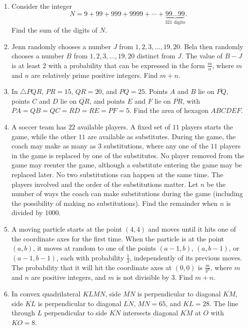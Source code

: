 \documentclass{article}
\begin{document}
\begin{enumerate}[label=\arabic*., itemsep=0.5em]
\item Consider the integer 
\begin{equation*}
N = 9 + 99 + 999 + 9999 + \cdots + \underbrace{99\ldots 99}_\text{321 digits}.
\end{equation*}
Find the sum of the digits of \(N\).\par \vspace{0.5em}\item Jenn randomly chooses a number \(J\) from \(1, 2, 3,\ldots, 19, 20\). Bela then randomly chooses a number \(B\) from \(1, 2, 3,\ldots, 19, 20\) distinct from \(J\). The value of \(B - J\) is at least \(2\) with a probability that can be expressed in the form \(\tfrac{m}{n}\), where \(m\) and \(n\) are relatively prime positive integers. Find \(m+n\).\par \vspace{0.5em}\item In \(\triangle PQR\), \(PR=15\), \(QR=20\), and \(PQ=25\). Points \(A\) and \(B\) lie on \(\overline{PQ}\), points \(C\) and \(D\) lie on \(\overline{QR}\), and points \(E\) and \(F\) lie on \(\overline{PR}\), with \(PA=QB=QC=RD=RE=PF=5\). Find the area of hexagon \(ABCDEF\).\par \vspace{0.5em}\item A soccer team has \(22\) available players. A fixed set of \(11\) players starts the game, while the other \(11\) are available as substitutes. During the game, the coach may make as many as \(3\) substitutions, where any one of the \(11\) players in the game is replaced by one of the substitutes. No player removed from the game may reenter the game, although a substitute entering the game may be replaced later. No two substitutions can happen at the same time. The players involved and the order of the substitutions matter. Let \(n\) be the number of ways the coach can make substitutions during the game (including the possibility of making no substitutions). Find the remainder when \(n\) is divided by \(1000\).\par \vspace{0.5em}\item A moving particle starts at the point \((4,4)\) and moves until it hits one of the coordinate axes for the first time. When the particle is at the point \((a,b)\), it moves at random to one of the points \((a-1,b)\), \((a,b-1)\), or \((a-1,b-1)\), each with probability \(\tfrac{1}{3}\), independently of its previous moves. The probability that it will hit the coordinate axes at \((0,0)\) is \(\tfrac{m}{3^n}\), where \(m\) and \(n\) are positive integers, and \(m\) is not divisible by \(3\). Find \(m + n\).\par \vspace{0.5em}\item In convex quadrilateral \(KLMN\), side \(\overline{MN}\) is perpendicular to diagonal \(\overline{KM}\), side \(\overline{KL}\) is perpendicular to diagonal \(\overline{LN}\), \(MN = 65\), and \(KL = 28\). The line through \(L\) perpendicular to side \(\overline{KN}\) intersects diagonal \(\overline{KM}\) at \(O\) with \(KO = 8\). 
\end{enumerate}
\end{document}

